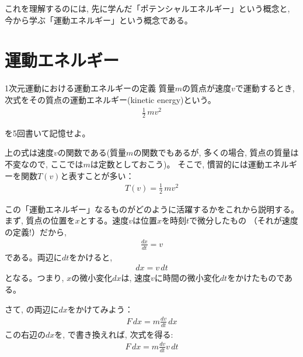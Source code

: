 これを理解するのには, 先に学んだ「ポテンシャルエネルギー」という概念と, 
今から学ぶ「運動エネルギー」という概念である。\\


\section{運動エネルギー}\label{sect:1D_kinetic_energy}

\begin{itembox}{1次元運動における運動エネルギーの定義}
質量$m$の質点が速度$v$で運動するとき, 次式をその質点の運動エネルギー(kinetic energy)という。
\begin{eqnarray} 
\frac{1}{2}\,mv^2\label{eq:kineticEnergy0}
\end{eqnarray}
\end{itembox}

\begin{q}\label{q:kinetic_energy}
を5回書いて記憶せよ。\end{q}

上の式は速度$v$の関数である(質量$m$の関数でもあるが, 
多くの場合, 質点の質量は不変なので, ここでは$m$は定数としておこう)。
そこで, 慣習的には運動エネルギーを関数$T(v)$と表すことが多い：
\begin{eqnarray} 
T(v)=\frac{1}{2}\,mv^2\label{eq:kineticEnergy}
\end{eqnarray}

この「運動エネルギー」なるものがどのように活躍するかをこれから説明する。
まず, 質点の位置を$x$とする。速度$v$は位置$x$を時刻$t$で微分したもの
（それが速度の定義!）だから, 
\begin{eqnarray}
\frac{dx}{dt}=v\label{eq:energy_def_velocity}
\end{eqnarray}
である。両辺に$dt$をかけると, 
\begin{eqnarray}
dx= v\,dt\label{eq:dv_vdt}
\end{eqnarray}
となる。つまり, $x$の微小変化$dx$は, 速度$v$に時間の微小変化$dt$をかけたものである。

さて, の両辺に$dx$をかけてみよう：
\begin{eqnarray} 
F\,dx= m\frac{dv}{dt}\,dx\label{eq:WandT00}
\end{eqnarray} 
この右辺の$dx$を, で書き換えれば, 次式を得る:
\begin{eqnarray} 
F\,dx= m\frac{dv}{dt}v\,dt\label{eq:WandT000}
\end{eqnarray} 

